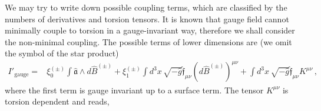 \documentclass[11pt]{article}
\numberwithin{equation}{section}
\begin{document}
We may try to write down possible coupling terms, which are classified by the numbers of derivatives and torsion tensors.  
It is known that gauge field cannot minimally couple to torsion in a gauge-invariant way, therefore we shall consider the non-minimal coupling.
The possible terms of lower dimensions are (we omit the symbol of the star product)
\begin{align}
I'_\text{gauge}=&  \xi_0^{(\pm)} \int \hat{\mathfrak{a}} \wedge d\hat{B}^{(\pm)}
+ \xi_1^{(\pm)} \int d^3 x \, \sqrt{-\hat{g}} \hat{\mathfrak{f}}_{\mu\nu} (d\hat{B}^{(\pm)})^{\mu\nu}
+ \int d^3 x \, \sqrt{-\hat{g}} \hat{\mathfrak{f}}_{\mu\nu} K^{\mu\nu} \,,
\end{align}
where the first term is gauge invariant up to a surface term.
The tensor $K^{\mu\nu}$ is torsion dependent and reads,
\end{document}
